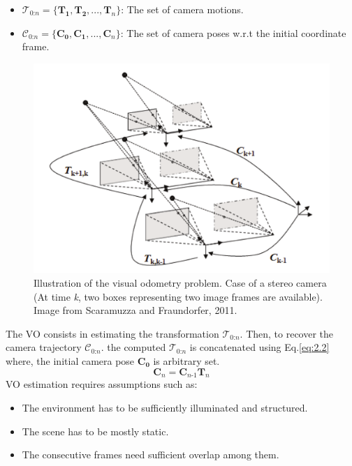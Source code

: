 \begin{itemize}
    \item $\mathcal{T_\textit{0:n}}=\{\mathbf{T_1},\mathbf{T_2},...,\mathbf{T_\textit{n}}\}$: The set of camera motions.
    \item $\mathcal{C_\textit{0:n}}=\{\mathbf{C_0},\mathbf{C_1},...,\mathbf{C_\textit{n}}\}$: The set of camera poses w.r.t the initial coordinate frame.
\end{itemize}
\begin{figure}[h]
    \centering
    \includegraphics[width=\linewidth]{assets/2_2.png}
    \caption{Illustration of the visual odometry problem. Case of a stereo camera (At time \textit{k}, two boxes representing two image frames are available). Image from Scaramuzza and Fraundorfer, 2011.}
    \label{fig:2.2}
\end{figure}
The VO consists in estimating the transformation $\mathcal{T_\textit{0:n}}$. Then, to recover the camera trajectory $\mathcal{C_\textit{0:n}}$. the computed $\mathcal{T_\textit{0:n}}$ is concatenated using Eq.\ref{eq:2.2} where, the initial camera pose $\mathbf{C_0}$ is arbitrary set.
\begin{equation} \label{eq:2.2}
    \mathbf{C_\textit{n}}=\mathbf{C_\textit{n-1}}\mathbf{T_\textit{n}}
\end{equation}
VO estimation requires assumptions such as:
\begin{itemize}
    \item The environment has to be sufficiently illuminated and structured.
    \item The scene has to be mostly static.
    \item The consecutive frames need sufficient overlap among them.
\end{itemize}
